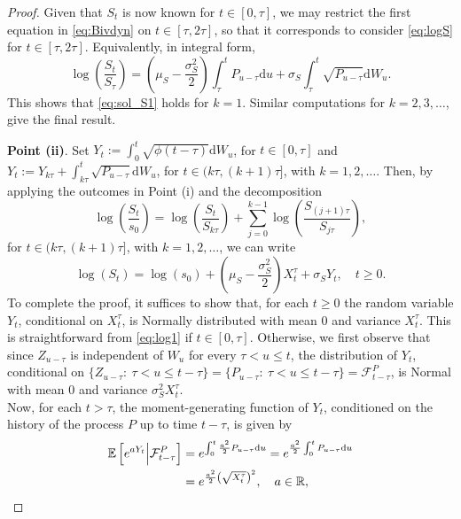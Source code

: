 \documentclass[12pt,centertags,reqno]{amsart}
\numberwithin{equation}{section} \makeatletter
\def \F {\mathcal F}
\def \R {\mathbb R}
\newcommand{\ud}{\mathrm d}
\newcommand{\esp}[2][\mathbb E] {#1\left[#2\right]}
\begin{document}
\begin{proof}
Given that $S_t$ is now known for $t \in [0,\tau]$, we may restrict the first equation in \eqref{eq:Bivdyn} on $t \in [\tau, 2\tau]$, so that it corresponds to consider \eqref{eq:logS} for $t \in [\tau, 2\tau]$.
Equivalently, in integral form,
\begin{equation} \label{eq:log}
\log\left(\frac{S_{t}}{S_{\tau}}\right) = \left(\mu_S-\frac{\sigma_S^2}{2}\right)\int_\tau^t P_{u-\tau} \ud u + \sigma_S\int_\tau^t\sqrt{P_{u-\tau}} \ud W_u.
\end{equation}
This shows that \eqref{eq:sol_S1} holds for $k = 1$.
Similar computations for $k=2,3,\ldots$, give the final result.

{\bf Point (ii)}. %
Set  $Y_t:=\int_0^t\sqrt{\phi \left( t-\tau \right)} \ud W_u $, for $t \in [0,\tau]$ and $Y_t:= Y_{k\tau}+ \int_{k\tau}^t\sqrt{P_{u-\tau}} \ud W_u $, for $t \in (k\tau,(k+1)\tau]$, with $k=1,2,\ldots$. Then, by applying the outcomes in Point (i) and the decomposition
$$
\log\left(\frac{S_{t}}{s_{0}}\right) =\log\left(\frac{S_{t}}{S_{k\tau}}\right)+\sum_{j=0}^{k-1}\log\left(\frac{S_{(j+1)\tau}}{S_{j\tau}}\right), %
$$
for $t\in (k\tau,(k+1)\tau]$, with $k=1,2,\ldots$, we can write
\begin{equation} \label{eq:LOG}
\log\left(S_{t}\right)= \log(s_0)+\left(\mu_S-\frac{\sigma_S^2}{2}\right)X_t^\tau +\sigma_S Y_t,\quad t \ge 0.
\end{equation}
To complete the proof, 
it suffices to show that, for each $t\ge 0$ the random variable $Y_t$, conditional on $X_t^\tau$, is Normally distributed with mean $0$ and variance $X_t^\tau$. This is straightforward from \eqref{eq:log1} if $t \in [0,\tau]$. Otherwise, we first observe that
since $Z_{u-\tau}$ is independent of $W_u$ for every $\tau < u \leq t$, the distribution of $Y_t$, conditional on $\{Z_{u-\tau}:\ \tau < u \leq t-\tau\}=\{P_{u-\tau}:\ \tau < u \leq t-\tau\} %
=\F_{t-\tau}^P$, is Normal with mean $0$ and variance $\sigma_S^2X_t^\tau$. \\
Now, for each $t > \tau$, the moment-generating function of $Y_t$, conditioned on the history of the process $P$ up to time $t-\tau$, is given by
\begin{align*}
\esp{e^{aY_t}\Big{|}\F_{t-\tau}^{P}}
& = e^{\int_0^t \frac{a^2}{2} P_{u-\tau} \ud u} =  e^{\frac{a^2}{2}  \int_0^t  P_{u-\tau} \ud u}\\
& = e^{\frac{a^2}{2}\left(\sqrt{X_t^\tau}\right)^2}, \quad  a \in \R,

\end{align*}
\end{proof}
\end{document}
